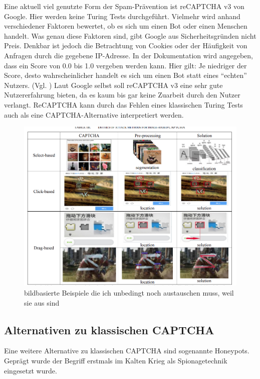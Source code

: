 Eine aktuell viel genutzte Form der Spam-Prävention ist reCAPTCHA v3 von Google. 
Hier werden keine Turing Tests durchgeführt. 
Vielmehr wird anhand verschiedener Faktoren bewertet, ob es sich um einen Bot oder einen Menschen handelt.
Was genau diese Faktoren sind, gibt Google aus Sicherheitsgründen nicht Preis. 
Denkbar ist jedoch die Betrachtung von Cookies oder der Häufigkeit von Anfragen durch die gegebene IP-Adresse.
In der Dokumentation wird angegeben, dass ein Score von 0.0 bis 1.0 vergeben werden kann. 
Hier gilt: Je niedriger der Score, desto wahrscheinlicher handelt es sich um einen Bot statt eines ``echten'' Nutzers. (Vgl. \cite{recaptchadoc})
Laut Google selbst soll reCAPTCHA v3 eine sehr gute Nutzererfahrung bieten, da es kaum bis gar keine Zuarbeit durch den Nutzer verlangt. \cite{googleblog:recaptcha}
ReCAPTCHA kann durch das Fehlen eines klassischen Turing Tests auch als eine CAPTCHA-Alternative interpretiert werden.

\begin{figure}
    \centering
    \includegraphics{gfx/mygraphics/unbedingtaustauschen2.png}
    \caption{bildbasierte Beispiele die ich unbedingt noch austauschen muss, weil sie aus \cite{surveyofresearch} sind}
    \label{fig:pr0grammcaptcha}
\end{figure}

\subsection{Alternativen zu klassischen CAPTCHA}
Eine weitere Alternative zu klassischen CAPTCHA sind sogenannte Honeypots. 
Geprägt wurde der Begriff erstmals im Kalten Krieg als Spionagetechnik eingesetzt wurde. \cite[p.2]{joshi:2011} 

